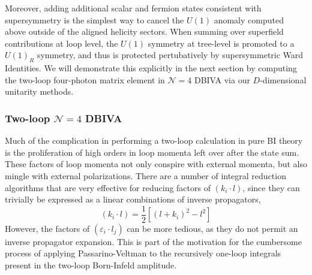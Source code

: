 \documentclass[11pt,letter]{article}
\begin{document}
Moreover, adding additional scalar and fermion states consistent with supersymmetry is the simplest way to cancel the $U(1)$ anomaly computed above outside of the aligned helicity sectors. When summing over superfield contributions at loop level, the $U(1)$ symmetry at tree-level is promoted to a $U(1)_R$ symmetry, and thus is protected pertubatively by supersymmetric Ward Identities. We will demonstrate this explicitly in the next section by computing the two-loop four-photon matrix element in $\mathcal{N}=4$ DBIVA via our $D$-dimensional unitarity methods. 

\subsubsection{Two-loop $\mathcal{N}=4$ DBIVA}\label{sec:2loopN4U}
Much of the complication in performing a two-loop calculation in pure BI theory is the proliferation of high orders in loop momenta left over after the state sum. These factors of loop momenta not only conspire with external momenta, but also mingle with external polarizations. There are a number of integral reduction algorithms \cite{Anastasiou:2004vj,vonManteuffel:2012np,Smirnov:2014hma,vonManteuffel:2014ixa,Smirnov:2019qkx,Smirnov:2020quc,Usovitsch:2020jrk,Maierhofer:2018gpa} that are very effective for reducing factors of $(k_i \cdot l)$, since they can trivially be expressed as a linear combinations of inverse propagators,
\begin{equation}
(k_i \cdot l) = \frac{1}{2}\left[(l+k_i)^2-l^2\right]
\end{equation}
However, the factors of $(\varepsilon_i\cdot l_j)$ can be more tedious, as they do not permit an inverse propagator expansion. This is part of the motivation for the cumbersome process of applying Passarino-Veltman to the recursively one-loop integrals present in the two-loop Born-Infeld amplitude.  
\end{document}
